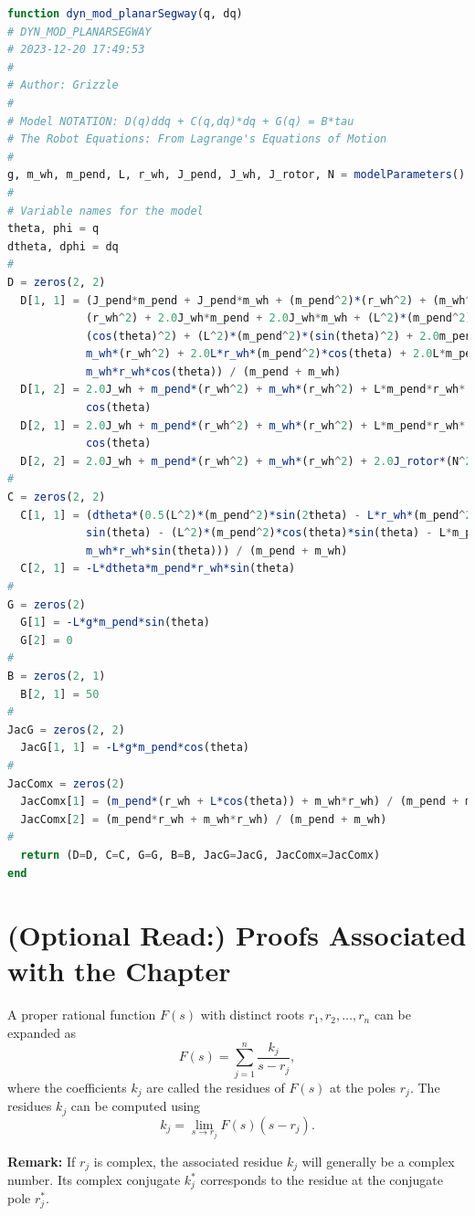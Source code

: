 

\begin{lstlisting}[language=Julia,style=mystyle]
function dyn_mod_planarSegway(q, dq)
# DYN_MOD_PLANARSEGWAY
# 2023-12-20 17:49:53
#
# Author: Grizzle
#
# Model NOTATION: D(q)ddq + C(q,dq)*dq + G(q) = B*tau 
# The Robot Equations: From Lagrange's Equations of Motion
#
g, m_wh, m_pend, L, r_wh, J_pend, J_wh, J_rotor, N = modelParameters() 
#
# Variable names for the model
theta, phi = q 
dtheta, dphi = dq
#
D = zeros(2, 2)
  D[1, 1] = (J_pend*m_pend + J_pend*m_wh + (m_pend^2)*(r_wh^2) + (m_wh^2)*
            (r_wh^2) + 2.0J_wh*m_pend + 2.0J_wh*m_wh + (L^2)*(m_pend^2)*
            (cos(theta)^2) + (L^2)*(m_pend^2)*(sin(theta)^2) + 2.0m_pend*
            m_wh*(r_wh^2) + 2.0L*r_wh*(m_pend^2)*cos(theta) + 2.0L*m_pend*
            m_wh*r_wh*cos(theta)) / (m_pend + m_wh)
  D[1, 2] = 2.0J_wh + m_pend*(r_wh^2) + m_wh*(r_wh^2) + L*m_pend*r_wh*
            cos(theta)
  D[2, 1] = 2.0J_wh + m_pend*(r_wh^2) + m_wh*(r_wh^2) + L*m_pend*r_wh*
            cos(theta)
  D[2, 2] = 2.0J_wh + m_pend*(r_wh^2) + m_wh*(r_wh^2) + 2.0J_rotor*(N^2)
#
C = zeros(2, 2)
  C[1, 1] = (dtheta*(0.5(L^2)*(m_pend^2)*sin(2theta) - L*r_wh*(m_pend^2)*
            sin(theta) - (L^2)*(m_pend^2)*cos(theta)*sin(theta) - L*m_pend*
            m_wh*r_wh*sin(theta))) / (m_pend + m_wh)
  C[2, 1] = -L*dtheta*m_pend*r_wh*sin(theta)
#
G = zeros(2)
  G[1] = -L*g*m_pend*sin(theta)
  G[2] = 0
#
B = zeros(2, 1)
  B[2, 1] = 50
#
JacG = zeros(2, 2)
  JacG[1, 1] = -L*g*m_pend*cos(theta)
#
JacComx = zeros(2)
  JacComx[1] = (m_pend*(r_wh + L*cos(theta)) + m_wh*r_wh) / (m_pend + m_wh)
  JacComx[2] = (m_pend*r_wh + m_wh*r_wh) / (m_pend + m_wh)
#
  return (D=D, C=C, G=G, B=B, JacG=JacG, JacComx=JacComx)
end

\end{lstlisting}



\section{(Optional Read:) Proofs Associated with the Chapter}
\label{sec:LaplaceProofs}


\begin{tcolorbox}[title=\textcolor{black}{Proof of Prop.~\ref{thm:PFEforODES} (Partial Fraction Expansion)}, sharp corners, colback=green!30, colframe=green!80!blue, breakable, fonttitle=\bfseries]
    A proper rational function \(F(s)\) with distinct roots \(r_1, r_2, \dots, r_n\) can be expanded as
\[
F(s) = \sum_{j=1}^n \frac{k_j}{s - r_j},
\]
where the coefficients \(k_j\) are called the residues of \(F(s)\) at the poles \(r_j\). The residues \(k_j\) can be computed using
\[
k_j = \lim_{s \to r_j} F(s) (s - r_j).
\]

\textbf{Remark:}  If \(r_j\) is complex, the associated residue \(k_j\) will generally be a complex number. Its complex conjugate \(k_j^\ast\) corresponds to the residue at the conjugate pole \({r}^\ast_j\). \\
\end{tcolorbox}

